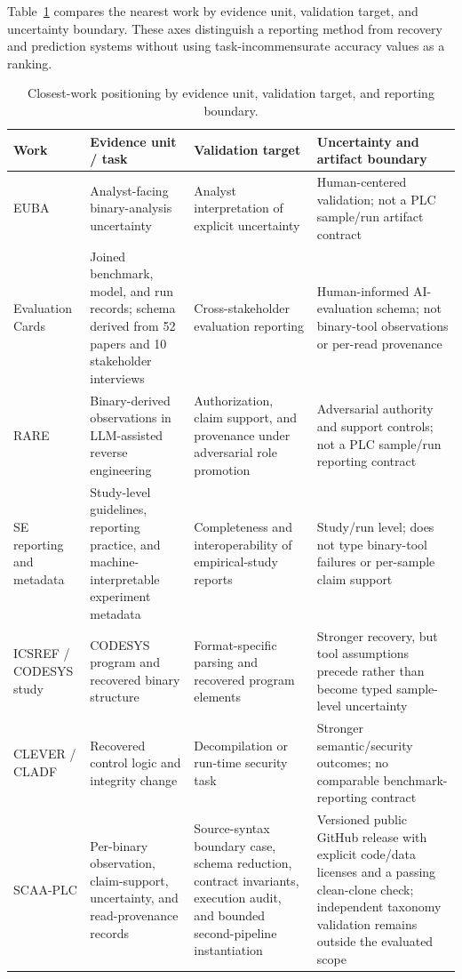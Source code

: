 \documentclass[manuscript,screen,review]{acmart}
\begin{document}
Table~\ref{tab:closest_work} compares the nearest work by evidence unit, validation target, and uncertainty boundary. These axes distinguish a reporting method from recovery and prediction systems without using task-incommensurate accuracy values as a ranking.

\begin{table}[t]
\centering
\small
\caption{Closest-work positioning by evidence unit, validation target, and reporting boundary.}
\label{tab:closest_work}
\begin{tabularx}{\textwidth}{>{\raggedright\arraybackslash}p{}>{\raggedright\arraybackslash}p{}>{\raggedright\arraybackslash}p{}>{\raggedright\arraybackslash}X}
\toprule
Work & Evidence unit / task & Validation target & Uncertainty and artifact boundary \\
\midrule
EUBA~\cite{euba_sandia2021} & Analyst-facing binary-analysis uncertainty & Analyst interpretation of explicit uncertainty & Human-centered validation; not a PLC sample/run artifact contract \\
Evaluation Cards~\cite{evaluation_cards_arxiv2026} & Joined benchmark, model, and run records; schema derived from 52 papers and 10 stakeholder interviews & Cross-stakeholder evaluation reporting & Human-informed AI-evaluation schema; not binary-tool observations or per-read provenance \\
RARE~\cite{santos_grueiro_rare2026} & Binary-derived observations in LLM-assisted reverse engineering & Authorization, claim support, and provenance under adversarial role promotion & Adversarial authority and support controls; not a PLC sample/run reporting contract \\
SE reporting and metadata~\cite{kitchenham_reporting2008,revoredo_reporting2021,santana_metadata2026} & Study-level guidelines, reporting practice, and machine-interpretable experiment metadata & Completeness and interoperability of empirical-study reports & Study/run level; does not type binary-tool failures or per-sample claim support \\
ICSREF / CODESYS study~\cite{icsref_ndss2019,benkraouda_codesys2023} & CODESYS program and recovered binary structure & Format-specific parsing and recovered program elements & Stronger recovery, but tool assumptions precede rather than become typed sample-level uncertainty \\
CLEVER / CLADF~\cite{clever_tifs2024,cladf_jiot2024} & Recovered control logic and integrity change & Decompilation or run-time security task & Stronger semantic/security outcomes; no comparable benchmark-reporting contract \\
SCAA-PLC & Per-binary observation, claim-support, uncertainty, and read-provenance records & Source-syntax boundary case, schema reduction, contract invariants, execution audit, and bounded second-pipeline instantiation & Versioned public GitHub release with explicit code/data licenses and a passing clean-clone check; independent taxonomy validation remains outside the evaluated scope \\
\bottomrule
\end{tabularx}
\end{table}
\end{document}
